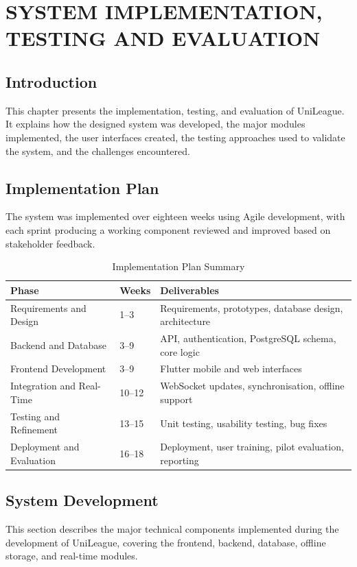 \documentclass[12pt,a4paper]{report}
\begin{document}
\chapter{SYSTEM IMPLEMENTATION, TESTING AND EVALUATION}
\section{Introduction}
This chapter presents the implementation, testing, and evaluation of UniLeague. It explains
how the designed system was developed, the major modules implemented, the user interfaces
created, the testing approaches used to validate the system, and the challenges encountered.

\section{Implementation Plan}
The system was implemented over eighteen weeks using Agile development, with each sprint
producing a working component reviewed and improved based on stakeholder feedback.

\begin{table}[H]
\centering
\caption{Implementation Plan Summary}
\begin{tabular}{p{4cm}p{3cm}p{7cm}}
\toprule
\textbf{Phase} & \textbf{Weeks} & \textbf{Deliverables}\\
\midrule
Requirements and Design & 1--3 & Requirements, prototypes, database design, architecture\\
Backend and Database & 3--9 & API, authentication, PostgreSQL schema, core logic\\
Frontend Development & 3--9 & Flutter mobile and web interfaces\\
Integration and Real-Time & 10--12 & WebSocket updates, synchronisation, offline support\\
Testing and Refinement & 13--15 & Unit testing, usability testing, bug fixes\\
Deployment and Evaluation & 16--18 & Deployment, user training, pilot evaluation, reporting\\
\bottomrule
\end{tabular}
\end{table}

\section{System Development}
This section describes the major technical components implemented during the development
of UniLeague, covering the frontend, backend, database, offline storage, and real-time modules.
\end{document}
